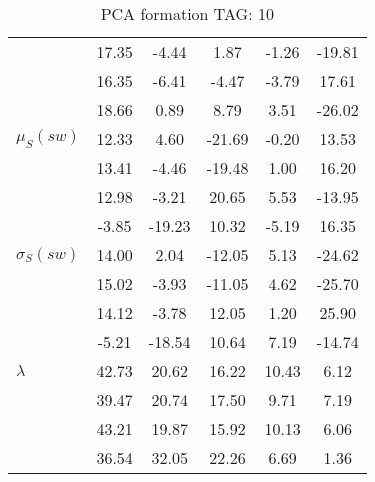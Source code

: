 \begin{table}[h!]
\begin{center}
\begin{tabular}{| l || c | c | c | c | c |}
 & 17.35  & -4.44  & 1.87  & -1.26  & -19.81 \\
 & 16.35  & -6.41  & -4.47  & -3.79  & 17.61 \\
 & 18.66  & 0.89  & 8.79  & 3.51  & -26.02 \\\hline
$\mu_S(sw)$ & 12.33  & 4.60  & -21.69  & -0.20  & 13.53 \\
 & 13.41  & -4.46  & -19.48  & 1.00  & 16.20 \\
 & 12.98  & -3.21  & 20.65  & 5.53  & -13.95 \\
 & -3.85  & -19.23  & 10.32  & -5.19  & 16.35 \\\hline
$\sigma_S(sw)$ & 14.00  & 2.04  & -12.05  & 5.13  & -24.62 \\
 & 15.02  & -3.93  & -11.05  & 4.62  & -25.70 \\
 & 14.12  & -3.78  & 12.05  & 1.20  & 25.90 \\
 & -5.21  & -18.54  & 10.64  & 7.19  & -14.74 \\\hline\hline
$\lambda$ & 42.73  & 20.62  & 16.22  & 10.43  & 6.12 \\
 & 39.47  & 20.74  & 17.50  & 9.71  & 7.19 \\
 & 43.21  & 19.87  & 15.92  & 10.13  & 6.06 \\
 & 36.54  & 32.05  & 22.26  & 6.69  & 1.36 \\\hline
\end{tabular}
\caption{PCA formation TAG: 10}
\end{center}
\end{table}